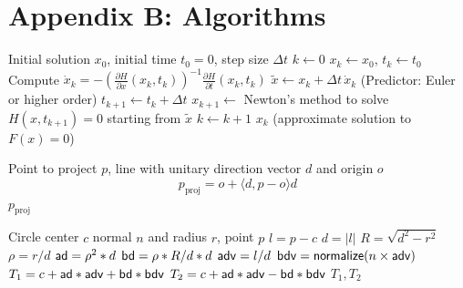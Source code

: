 \section{Appendix B: Algorithms}

\begin{algorithm}[H]
\caption{Homotopy Path Tracking via Predictor-Corrector}
\label{alg:homotopy_path_tracking}
\begin{algorithmic}[1]
\REQUIRE Initial solution $x_0$, initial time $t_0 = 0$, step size $\Delta t$
\STATE $k \leftarrow 0$
\STATE $x_k \leftarrow x_0$, $t_k \leftarrow t_0$
    \STATE Compute $\dot x_k = -\left(\frac{\partial H}{\partial x}(x_k, t_k)\right)^{-1} \frac{\partial H}{\partial t}(x_k, t_k)$
    \STATE $\tilde x \leftarrow x_k + \Delta t\,\dot x_k$ \; (Predictor: Euler or higher order)
    \STATE $t_{k+1} \leftarrow t_k + \Delta t$
    \STATE $x_{k+1} \leftarrow$ Newton's method to solve $H(x, t_{k+1})=0$ starting from $\tilde x$
    \STATE $k \leftarrow k+1$
\ENDWHILE
\RETURN $x_k$ (approximate solution to $F(x)=0$)
\end{algorithmic}
\end{algorithm}

%
%
\begin{algorithm}[H]
\caption{Project Point Onto Line}
\label{alg:project_point_onto_line}
\begin{algorithmic}[1]
\REQUIRE Point to project $p$, line with unitary direction vector $d$ and origin $o$
\STATE
\[ p_{\text{proj}} = o + \langle d, p - o\rangle d \]
\RETURN $p_{\text{proj}}$
\end{algorithmic}
\end{algorithm}

%
%
\begin{algorithm}[H]
\caption{Calculate tangent points on a circle from a reference point $p$}
\label{alg:tangent_points_circle_point}
\begin{algorithmic}[1]
\REQUIRE Circle center $c$ normal $n$ and radius $r$, point $p$
\STATE $l = p - c$
\STATE $d = |l|$
\STATE $R = \sqrt{d^2 - r^2}$
\STATE $\rho = r/d$
\STATE $\mathsf{ad} = \rho^2 * d$
\STATE $\mathsf{bd} = \rho * R / d * d$
\STATE $\mathsf{adv} = l / d$
\STATE $\mathsf{bdv} = \mathsf{normalize}(n \times \mathsf{adv})$
\STATE $T_1 = c + \mathsf{ad} * \mathsf{adv} + \mathsf{bd} * \mathsf{bdv}$
\STATE $T_2 = c + \mathsf{ad} * \mathsf{adv} - \mathsf{bd} * \mathsf{bdv}$
\RETURN $T_1, T_2$
\end{algorithmic}
\end{algorithm}

